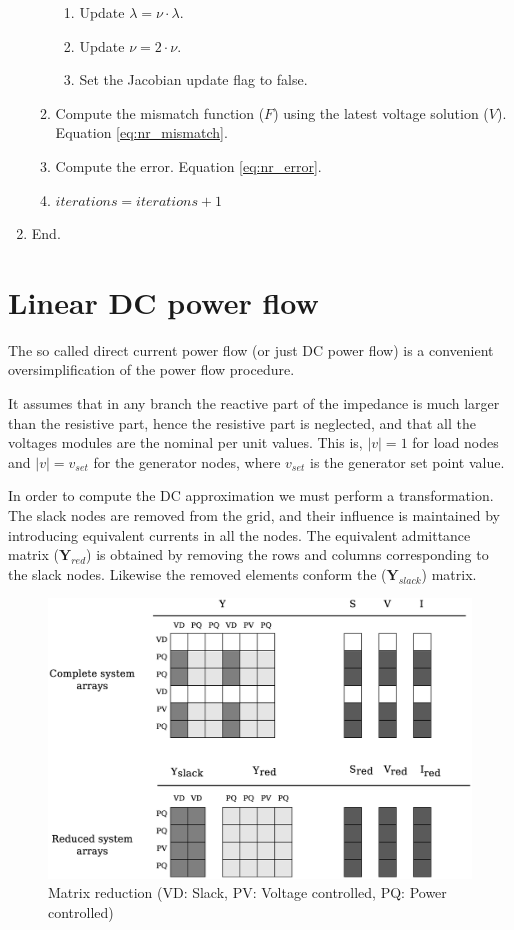 \documentclass[a4paper,twoside,fleqn]{tufte-book}
\begin{document}
\begin{enumerate}
\begin{enumerate}
\begin{enumerate}
		\item Update $\lambda = \nu \cdot \lambda$.
		
		\item Update $\nu = 2 \cdot \nu$.
		
		\item Set the Jacobian update flag to false.
		\end{enumerate}
	
	\item Compute the mismatch function ($F$) using the latest voltage solution ($V$). Equation \ref{eq:nr_mismatch}.
	
	\item Compute the error. Equation \ref{eq:nr_error}.
	
	\item $iterations = iterations + 1$
	\end{enumerate}

\item End.
\end{enumerate}

\section{Linear DC power flow}
The so called direct current power flow (or just DC power flow) is a convenient oversimplification of the power flow procedure.

It assumes that in any branch the reactive part of the impedance is much larger than the resistive part, hence the resistive part is neglected, and that all the voltages modules are the nominal per unit values. This is, $|v|=1$ for load nodes and $|v|=v_{set}$ for the generator nodes, where $v_{set}$ is the generator set point value.

In order to compute the DC approximation we must perform a transformation. The slack nodes are removed from the grid, and their influence is maintained by introducing equivalent currents in all the nodes. The equivalent admittance matrix ($\textbf{Y}_{red}$) is obtained by removing the rows and columns corresponding to the slack nodes. Likewise the removed elements conform the ($\textbf{Y}_{slack}$) matrix.

\begin{figure}[h!]
	\centering
	\includegraphics[width=0.85\linewidth]{img/Matrix_reduction.eps}
	\caption{Matrix reduction (VD: Slack, PV: Voltage controlled, PQ: Power controlled)}
	\label{fig:Matrix_reduction}
\end{figure}
\end{document}

